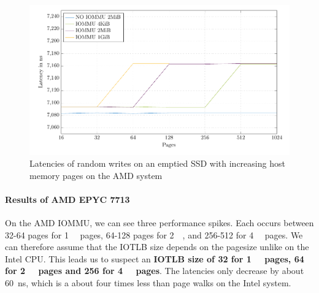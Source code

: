\begin{figure}[H]
  \centering
  \includegraphics[width=\textwidth]{figures/psmedsepyc}
  \caption{Latencies of random writes on an emptied SSD with increasing host memory pages on the AMD system}
  \label{fig:med-psepyc}
\end{figure}

\paragraph{Results of AMD EPYC 7713}
On the AMD IOMMU, we can see three performance spikes. Each occurs between 32-64 pages for \qty{1}{\gibi\byte} pages, 64-128 pages for \qty{2}{\mebi\byte}, and 256-512 for \qty{4}{\kibi\byte} pages.
We can therefore assume that the IOTLB size depends on the pagesize unlike on the Intel CPU. This leads us to suspect an \textbf{IOTLB size of 32 for \qty{1}{\gibi\byte} pages, 64 for \qty{2}{\mebi\byte} pages and 256 for \qty{4}{\kibi\byte} pages}. The latencies only decrease by about \qty{60}{ns}, which is a about four times less than page walks on the Intel system.